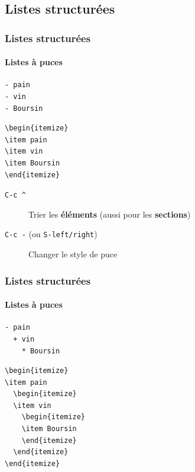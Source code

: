 \documentclass[presentation,t,hideothersubsections]{beamer}
\begin{document}
\subsection{Listes structurées}
\label{sec-2-6}
\begin{frame}[fragile]
\frametitle{Listes structurées}
\framesubtitle{Listes à puces}
\label{sec-2-6-1}



\lstset{language=org}
\begin{lstlisting}
- pain
- vin
- Boursin
\end{lstlisting}


\lstset{language=TeX}
\begin{lstlisting}
\begin{itemize}
\item pain
\item vin
\item Boursin
\end{itemize}
\end{lstlisting}

\begin{description}
\item[\texttt{C-c \textasciicircum{}}] Trier les \textbf{éléments} (aussi pour les \textbf{sections})
\item[\texttt{C-c -} (ou \texttt{S-left/right})] Changer le style de puce
\end{description}
\end{frame}
\begin{frame}[fragile]
\frametitle{Listes structurées}
\framesubtitle{Listes à puces}
\label{sec-2-6-2}



\lstset{language=org}
\begin{lstlisting}
- pain
  + vin
    * Boursin
\end{lstlisting}


\lstset{language=TeX}
\begin{lstlisting}
\begin{itemize}
\item pain
  \begin{itemize}
  \item vin
    \begin{itemize}
    \item Boursin
    \end{itemize}
  \end{itemize}
\end{itemize}
\end{lstlisting}
\end{frame}
\end{document}
